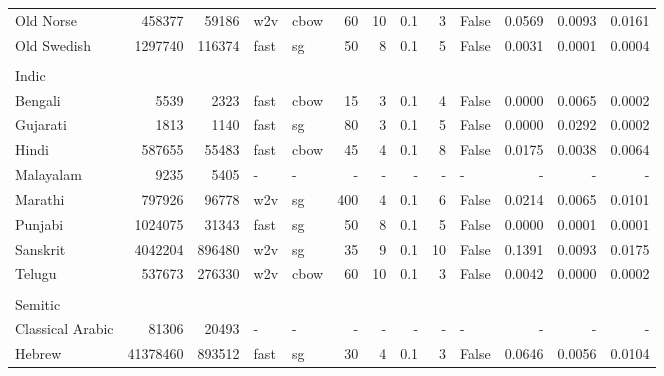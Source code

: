 \documentclass[11pt,a4paper]{article}
\begin{document}
\begin{table}[t]
\begin{tabular}{lrrllrrrrlrrr}
   \quad Old Norse & \num{458377} & \num{59186} & w2v & cbow & \num{60} & \num{10} & \num{.1} & \num{3} & False & \num{0.0569} & \num{0.0093} & \num{0.0161} \\
   \quad Old Swedish & \num{1297740} & \num{116374} &  fast & sg & \num{50} & \num{8} & \num{.1} & \num{5} & False & \num{0.0031} & \num{0.0001} & \num{0.0004} \\
    &&&&&&&&&&&&\\[-4pt]
    Indic&&&&&&&&&&&&\\
\quad Bengali & \num{5539} & \num{2323} & fast & cbow & \num{15} & \num{3} & \num{.1} & \num{4} & False & \num{0.0000} & \num{0.0065} & \num{0.0002} \\
   \quad Gujarati & \num{1813} & \num{1140} & fast & sg & \num{80} & \num{3} & \num{.1} & \num{5} & False & \num{0.0000} & \num{0.0292} & \num{0.0002} \\
   \quad Hindi & \num{587655} & \num{55483} & fast & cbow & \num{45} & \num{4} & \num{.1} & \num{8} & False & \num{0.0175} & \num{0.0038} & \num{0.0064}\\
   \quad Malayalam & \num{9235} & \num{5405} & - & - & - & - & - & - & - & - & - & - \\
    \quad Marathi  & \num{797926} & \num{96778} & w2v & sg & \num{400} & \num{4} & \num{.1} & \num{6} & False & \num{0.0214} & \num{0.0065} & \num{0.0101} \\
    \quad Punjabi & \num{1024075} & \num{31343} & fast & sg & \num{50} & \num{8} & \num{.1} & \num{5} & False & \num{0.0000} & \num{0.0001} & \num{0.0001} \\
    \quad Sanskrit & \num{4042204} & \num{896480} & w2v & sg & \num{35} & \num{9} & \num{.1} & \num{10} & False & \num{0.1391} & \num{0.0093} & \num{0.0175}\\
    \quad Telugu & \num{537673} & \num{276330} &  w2v & cbow & \num{60} & \num{10} & \num{.1} & \num{3} & False & \num{0.0042} & \num{0.0000} & \num{0.0002} \\
    &&&&&&&&&&&&\\[-4pt]
    Semitic&&&&&&&&&&&&\\
  \quad Classical Arabic & \num{81306} & \num{20493} & - & - & - & - & - & - & - & - & - & - \\
   \quad Hebrew & \num{41378460} & \num{893512} & fast & sg & \num{30} & \num{4} & \num{.1} & \num{3} & False & \num{0.0646} & \num{0.0056} & \num{0.0104} \\ 
\bottomrule
\end{tabular}


\end{table}
\end{document}
